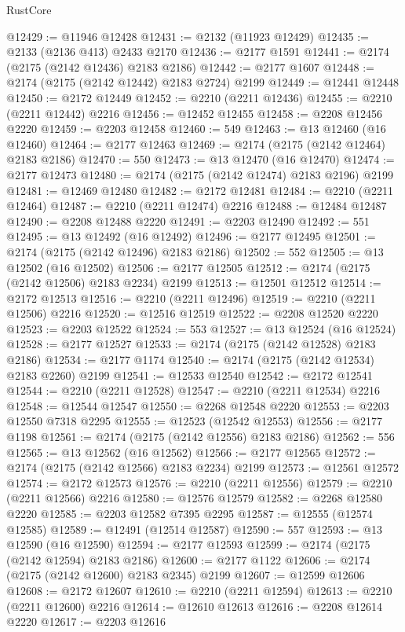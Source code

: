 \begin{lexlean}{RustCore}
\begin{coremodule}
@12429 := @11946 @12428
@12431 := @2132 (@11923 @12429)
@12435 := @2133 (@2136 @413) @2433 @2170
@12436 := @2177 @1591
@12441 := @2174 (@2175 (@2142 @12436) @2183 @2186)
@12442 := @2177 @1607
@12448 := @2174 (@2175 (@2142 @12442) @2183 @2724) @2199
@12449 := @12441 @12448
@12450 := @2172 @12449
@12452 := @2210 (@2211 @12436)
@12455 := @2210 (@2211 @12442) @2216
@12456 := @12452 @12455
@12458 := @2208 @12456 @2220
@12459 := @2203 @12458
@12460 := 549
@12463 := @13 @12460 (@16 @12460)
@12464 := @2177 @12463
@12469 := @2174 (@2175 (@2142 @12464) @2183 @2186)
@12470 := 550
@12473 := @13 @12470 (@16 @12470)
@12474 := @2177 @12473
@12480 := @2174 (@2175 (@2142 @12474) @2183 @2196) @2199
@12481 := @12469 @12480
@12482 := @2172 @12481
@12484 := @2210 (@2211 @12464)
@12487 := @2210 (@2211 @12474) @2216
@12488 := @12484 @12487
@12490 := @2208 @12488 @2220
@12491 := @2203 @12490
@12492 := 551
@12495 := @13 @12492 (@16 @12492)
@12496 := @2177 @12495
@12501 := @2174 (@2175 (@2142 @12496) @2183 @2186)
@12502 := 552
@12505 := @13 @12502 (@16 @12502)
@12506 := @2177 @12505
@12512 := @2174 (@2175 (@2142 @12506) @2183 @2234) @2199
@12513 := @12501 @12512
@12514 := @2172 @12513
@12516 := @2210 (@2211 @12496)
@12519 := @2210 (@2211 @12506) @2216
@12520 := @12516 @12519
@12522 := @2208 @12520 @2220
@12523 := @2203 @12522
@12524 := 553
@12527 := @13 @12524 (@16 @12524)
@12528 := @2177 @12527
@12533 := @2174 (@2175 (@2142 @12528) @2183 @2186)
@12534 := @2177 @1174
@12540 := @2174 (@2175 (@2142 @12534) @2183 @2260) @2199
@12541 := @12533 @12540
@12542 := @2172 @12541
@12544 := @2210 (@2211 @12528)
@12547 := @2210 (@2211 @12534) @2216
@12548 := @12544 @12547
@12550 := @2268 @12548 @2220
@12553 := @2203 @12550 @7318 @2295
@12555 := @12523 (@12542 @12553)
@12556 := @2177 @1198
@12561 := @2174 (@2175 (@2142 @12556) @2183 @2186)
@12562 := 556
@12565 := @13 @12562 (@16 @12562)
@12566 := @2177 @12565
@12572 := @2174 (@2175 (@2142 @12566) @2183 @2234) @2199
@12573 := @12561 @12572
@12574 := @2172 @12573
@12576 := @2210 (@2211 @12556)
@12579 := @2210 (@2211 @12566) @2216
@12580 := @12576 @12579
@12582 := @2268 @12580 @2220
@12585 := @2203 @12582 @7395 @2295
@12587 := @12555 (@12574 @12585)
@12589 := @12491 (@12514 @12587)
@12590 := 557
@12593 := @13 @12590 (@16 @12590)
@12594 := @2177 @12593
@12599 := @2174 (@2175 (@2142 @12594) @2183 @2186)
@12600 := @2177 @1122
@12606 := @2174 (@2175 (@2142 @12600) @2183 @2345) @2199
@12607 := @12599 @12606
@12608 := @2172 @12607
@12610 := @2210 (@2211 @12594)
@12613 := @2210 (@2211 @12600) @2216
@12614 := @12610 @12613
@12616 := @2208 @12614 @2220
@12617 := @2203 @12616

\end{coremodule}
\end{lexlean}

